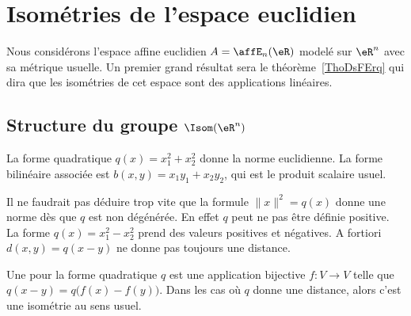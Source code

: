 
\section{Isométries de l'espace euclidien}

Nous considérons l'espace affine euclidien \( A=\affE_n(\eR)\) modelé sur \( \eR^n\) avec sa métrique usuelle. Un premier grand résultat sera le théorème~\ref{ThoDsFErq} qui dira que les isométries de cet espace sont des applications linéaires.

\subsection{Structure du groupe  \texorpdfstring{\( \Isom(\eR^n)\)}{Isom(Rn)} }

\begin{example}
    La forme quadratique \( q(x)=x_1^2+x_2^2\) donne la norme euclidienne. La forme bilinéaire associée est \( b(x,y)=x_1y_1+x_2y_2\), qui est le produit scalaire usuel.
\end{example}

Il ne faudrait pas déduire trop vite que la formule \( \| x \|^2=q(x)\) donne une norme dès que \( q\) est non dégénérée. En effet \( q\) peut ne pas être définie positive. La forme \( q(x)=x_1^2-x_2^2\) prend des valeurs positives et négatives. A fortiori \( d(x,y)=q(x-y)\) ne donne pas toujours une distance.

\begin{definition}      \label{DEFooECTUooRxBhHf}
    Une  pour la forme quadratique \( q\) est une application bijective \( f\colon V\to V\) telle que \( q(x-y)=q\big( f(x)-f(y) \big)\). Dans les cas où \( q\) donne une distance, alors c'est une isométrie au sens usuel.
\end{definition}

